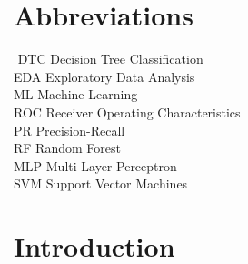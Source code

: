 

\chapter*{Abbreviations}
\begin{tabbing}
\hspace{50mm}\=\kill
DTC \>	Decision Tree Classification\\
EDA \>	Exploratory Data Analysis\\
ML \>	Machine Learning\\
ROC \>	Receiver Operating Characteristics\\
PR \>	Precision-Recall\\
RF \> Random Forest\\
MLP \> Multi-Layer Perceptron\\
SVM \> Support Vector Machines\\
\end{tabbing}


















\newpage
{}

\chapter{Introduction}
\setcounter{figure}{0} %

